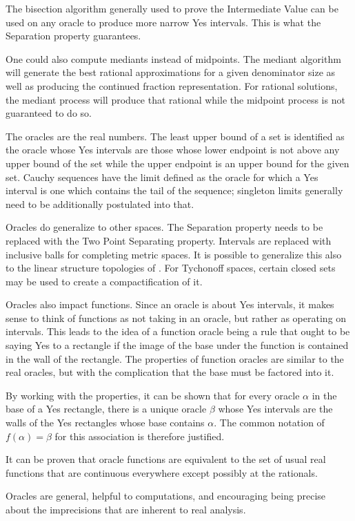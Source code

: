 \documentclass[12pt]{article}
\begin{document}
The bisection algorithm generally used to prove the Intermediate Value can be used on any oracle to produce more narrow Yes intervals. This is what the Separation property guarantees. 

One could also compute mediants instead of midpoints. The mediant algorithm will generate the best rational approximations for a given denominator size as well as producing the continued fraction representation. For rational solutions, the mediant process will produce that rational while the midpoint process is not guaranteed to do so. 

The oracles are the real numbers. The least upper bound of a set is identified as the oracle whose Yes intervals are those whose lower endpoint is not above any upper bound of the set while the upper endpoint is an upper bound for the given set. Cauchy sequences have the limit defined as the oracle for which a Yes interval is one which contains the tail of the sequence; singleton limits generally need to be additionally postulated into that. 

Oracles do generalize to other spaces. The Separation property needs to be replaced with the Two Point Separating property. Intervals are replaced with inclusive balls for completing metric spaces. It is possible to generalize this also to the linear structure topologies of \cite{maudlin}. For Tychonoff spaces, certain closed sets may be used to create a compactification of it. 

Oracles also impact functions. Since an oracle is about Yes intervals, it makes sense to think of functions as not taking in an oracle, but rather as operating on intervals. This leads to the idea of a function oracle being a rule that ought to be saying Yes to a rectangle if the image of the base under the function is contained in the wall of the rectangle. The properties of function oracles are similar to the real oracles, but with the complication that the base must be factored into it. 

By working with the properties, it can be shown that for every oracle $\alpha$ in the base of a Yes rectangle, there is a unique oracle $\beta$ whose Yes intervals are the walls of the Yes rectangles whose base contains $\alpha$. The common notation of $f(\alpha) = \beta$ for this association is therefore justified. 

It can be proven that oracle functions are equivalent to the set of usual real functions that are continuous everywhere except possibly at the rationals. 

Oracles are general, helpful to computations, and encouraging being precise about the imprecisions that are inherent to real analysis. 

\medskip

\printbibliography
\end{document}
